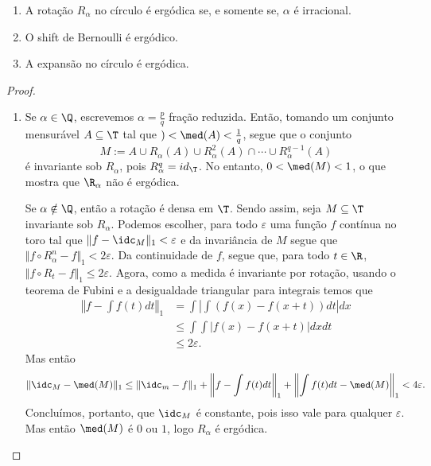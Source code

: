 \begin{proposition}
	\begin{enumerate}
	\item A rotação $R_\alpha$ no círculo é ergódica se, e somente se, $\alpha$ é irracional.
	\item O shift de Bernoulli é ergódico.
	\item A expansão no círculo é ergódica.
	\end{enumerate}
\end{proposition}
\begin{proof}
\begin{enumerate}
	\item Se $\alpha \in \Q$, escrevemos $\alpha=\frac{p}{q}$ fração reduzida. Então, tomando um conjunto mensurável $A \subseteq \T$ tal que $)<\med(A)<\frac{1}{q}$, segue que o conjunto
	\begin{equation*}
	M := A \cup R_{\alpha}(A) \cup R^2_{\alpha}(A) \cap \cdots \cup R^{q-1}_{\alpha}(A)
	\end{equation*}
é invariante sob $R_{\alpha}$, pois $R_{\alpha}^q=id_{\T}$. No entanto, $0<\med(M)< 1$, o que mostra que $\R_\alpha$ não é ergódica.

	Se $\alpha \notin \Q$, então a rotação é densa em $\T$. Sendo assim, seja $M \subseteq \T$ invariante sob $R_\alpha$. Podemos escolher, para todo $\varepsilon$ uma função $f$  contínua no toro tal que $\Vert f-\idc_M \Vert_1 < \varepsilon$ e da invariância de $M$ segue que $\Vert f\circ R^n_\alpha-f\Vert_1<2\varepsilon$. Da continuidade de $f$, segue que, para todo $t \in \R$, $\Vert f\circ R_t-f\Vert_1\leq2\varepsilon$. Agora, como a medida é invariante por rotação, usando o teorema de Fubini e a desigualdade triangular para integrais temos que
	\begin{align*}
	\left\Vert f-\int f(t) dt\right\Vert_1 &= \int\left|\int (f(x)-f(x+t))dt \right|dx \\
	&\leq \int \int |f(x)-f(x+t)|dxdt \\
	&\leq 2\varepsilon.
	\end{align*}
Mas então
	\begin{equation*}
	\Vert \idc_M-\med(M) \Vert_1 \leq \Vert\idc_m-f\Vert_1+\left\Vert f-\int f(t) dt\right\Vert_1+\left\Vert \int f(t) dt-\med(M)\right\Vert_1<4\varepsilon.
	\end{equation*}
Concluímos, portanto, que $\idc_M$ é constante, pois isso vale para qualquer $\varepsilon$. Mas então $\med(M)$ é $0$ ou $1$, logo $R_\alpha$ é ergódica.


\end{enumerate}
\end{proof}
